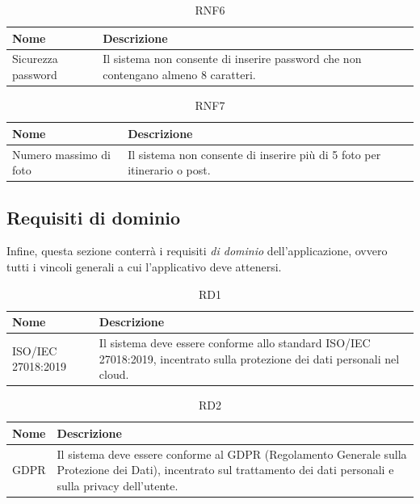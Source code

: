 \documentclass{natourDoc}
\begin{document}
\begin{table}[H]
	\centering
	\begin{tabular}{ |p{5cm}|p{10.3cm}| }
		\hline
		\rowcolor{PineGreen!70}
		\textbf{Nome}      & \textbf{Descrizione}                                            \\
		\hline
		Sicurezza password & Il sistema non consente di inserire password che non contengano
		almeno 8 caratteri.                                                                  \\
		\hline
	\end{tabular}
	\caption{RNF6}
\end{table}

\begin{table}[H]
	\centering
	\begin{tabular}{ |p{5cm}|p{10.3cm}| }
		\hline
		\rowcolor{PineGreen!70}
		\textbf{Nome}          & \textbf{Descrizione}                                                     \\
		\hline
		Numero massimo di foto & Il sistema non consente di inserire più di 5 foto per itinerario o post. \\
		\hline
	\end{tabular}
	\caption{RNF7}
\end{table}

\newpage
\subsection{Requisiti di dominio}
Infine, questa sezione conterrà i requisiti \textit{di dominio} dell'applicazione, ovvero tutti i vincoli generali a cui l'applicativo
deve attenersi. \\

\begin{table}[H]
	\centering
	\begin{tabular}{ |p{5cm}|p{10.3cm}| }
		\hline
		\rowcolor{PineGreen!70}
		\textbf{Nome}      & \textbf{Descrizione}                                              \\
		\hline
		ISO/IEC 27018:2019 & Il sistema deve essere conforme allo standard ISO/IEC 27018:2019,
		incentrato sulla protezione dei dati personali nel cloud.                              \\
		\hline
	\end{tabular}
	\caption{RD1}

\end{table}

\begin{table}[H]
	\centering
	\begin{tabular}{ |p{5cm}|p{10.3cm}| }
		\hline
		\rowcolor{PineGreen!70}
		\textbf{Nome} & \textbf{Descrizione}                                                                      \\
		\hline
		GDPR          & Il sistema deve essere conforme al GDPR (Regolamento Generale sulla Protezione dei Dati),
		incentrato sul trattamento dei dati personali e sulla privacy dell’utente.                                \\
		\hline
	\end{tabular}
	\caption{RD2}

\end{table}
\end{document}
